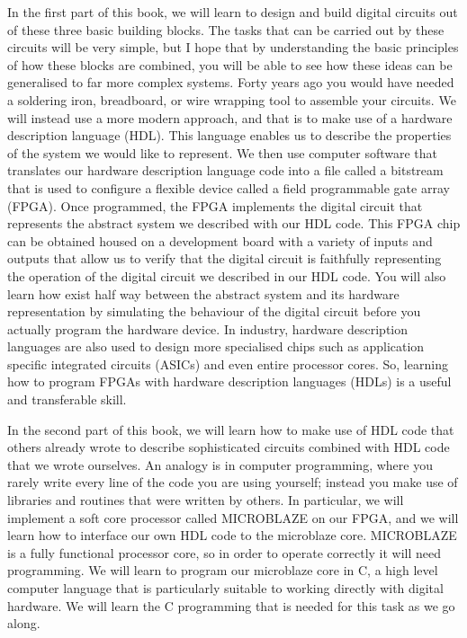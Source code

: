 \documentclass[../physical_computing.tex]{subfiles}
\begin{document}
In the first part of this book, we will learn to design and build digital circuits out of these three basic building blocks. The tasks that can be carried out by these circuits will be very simple, but I hope that by understanding the basic principles of how these blocks are combined, you will be able to see how these ideas can be generalised to far more complex systems. Forty years ago you would have needed a soldering iron, breadboard, or wire wrapping tool to assemble your circuits. We will instead use a more modern approach, and that is to make use of a hardware description language (HDL). This language enables us to describe the properties of the system we would like to represent. We then use computer software that translates our hardware description language code into a file called a bitstream that is used to configure a flexible device called a field programmable gate array (FPGA). Once programmed, the FPGA implements the digital circuit that represents the abstract system we described with our HDL code. This FPGA chip can be obtained housed on a development board with a variety of inputs and outputs that allow us to verify that the digital circuit is faithfully representing the operation of the digital circuit we described in our HDL code. You will also learn how exist half way between the abstract system and its hardware representation by simulating the behaviour of the digital circuit before you actually program the hardware device. In industry, hardware description languages are also used to design more specialised chips such as application specific integrated circuits (ASICs) and even entire processor cores. So, learning how to program FPGAs with hardware description languages (HDLs) is a useful and transferable skill. 

In the second part of this book, we will learn how to make use of HDL code that others already wrote to describe sophisticated circuits combined with HDL code that we wrote ourselves. An analogy is in computer programming, where you rarely write every line of the code you are using yourself; instead you make use of libraries and routines that were written by others. In particular, we will implement a soft core processor called MICROBLAZE on our FPGA, and we will learn how to interface our own HDL code to the microblaze core. MICROBLAZE is a fully functional processor core, so in order to operate correctly it will need programming. We will learn to program our microblaze core in C, a high level computer language that is particularly suitable to working directly with digital hardware. We will learn the C programming that is needed for this task as we go along.
\end{document}
